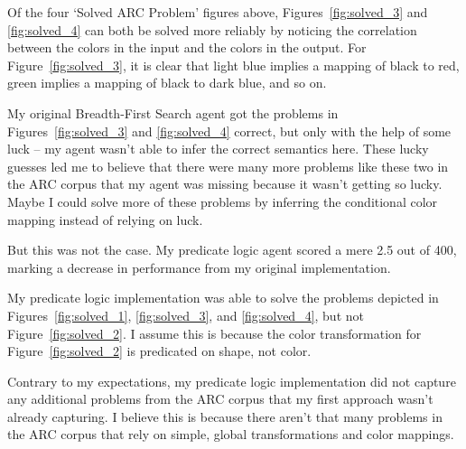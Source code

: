 \documentclass[letterpaper]{article} %
\begin{document}
\begin{table}[H]
    \centering
    \caption{Results Table}
\end{table}

Of the four `Solved ARC Problem' figures above, Figures~\ref{fig:solved_3} and \ref{fig:solved_4} can both be solved more reliably by noticing the correlation between the colors in the input and the colors in the output. For Figure~\ref{fig:solved_3}, it is clear that light blue implies a mapping of black to red, green implies a mapping of black to dark blue, and so on.

\bigskip

My original Breadth-First Search agent got the problems in Figures~\ref{fig:solved_3} and \ref{fig:solved_4} correct, but only with the help of some luck -- my agent wasn't able to infer the correct semantics here. These lucky guesses led me to believe that there were many more problems like these two in the ARC corpus that my agent was missing because it wasn't getting so lucky. Maybe I could solve more of these problems by inferring the conditional color mapping instead of relying on luck.

\bigskip

But this was not the case. My predicate logic agent scored a mere 2.5 out of 400, marking a decrease in performance from my original implementation.

\bigskip

My predicate logic implementation was able to solve the problems depicted in Figures~\ref{fig:solved_1}, \ref{fig:solved_3}, and \ref{fig:solved_4}, but not Figure~\ref{fig:solved_2}. I assume this is because the color transformation for Figure~\ref{fig:solved_2} is predicated on shape, not color.

\bigskip

Contrary to my expectations, my predicate logic implementation did not capture any additional problems from the ARC corpus that my first approach wasn't already capturing. I believe this is because there aren't that many problems in the ARC corpus that rely on simple, global transformations and color mappings.
\end{document}
